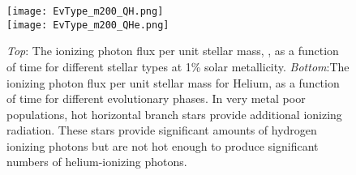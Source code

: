 \begin{figure}
  \begin{center}
    \texttt{[image: EvType\_m200\_QH.png]}\\
    \texttt{[image: EvType\_m200\_QHe.png]}
    \caption{\emph{Top}: The ionizing photon flux per unit stellar mass, \QHat, as a function of time for different stellar types at 1\% solar metallicity. \emph{Bottom}:The ionizing photon flux per unit stellar mass for Helium, \QHe as a function of time for different evolutionary phases. In very metal poor populations, hot horizontal branch stars provide additional ionizing radiation. These stars provide significant amounts of hydrogen ionizing photons but are not hot enough to produce significant numbers of helium-ionizing photons.}
    \label{fig:m2QF}
  \end{center}
\end{figure}
